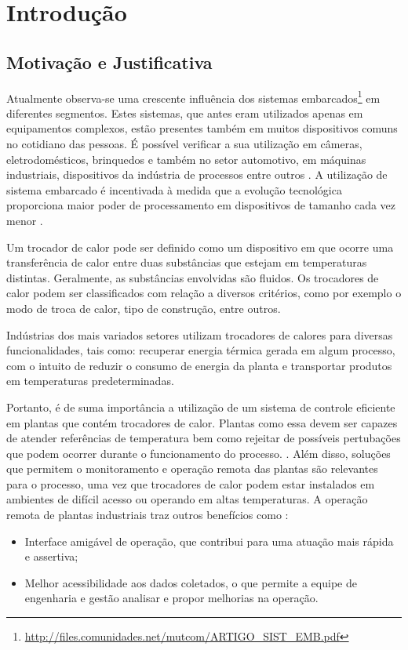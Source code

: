 \chapter{Introdução}
	
	\section{Motivação e Justificativa}
	
	Atualmente observa-se uma crescente influência dos sistemas embarcados\footnote{\url{http://files.comunidades.net/mutcom/ARTIGO_SIST_EMB.pdf}} em diferentes segmentos. Estes sistemas, que antes eram utilizados apenas em equipamentos complexos, estão presentes também em muitos dispositivos comuns no cotidiano das pessoas. É possível verificar a sua utilização em câmeras, eletrodomésticos, brinquedos e também no setor automotivo, em máquinas industriais, dispositivos da indústria de processos entre outros \cite{fabian2017,luiz2011}. A utilização de sistema embarcado é incentivada à medida que a evolução tecnológica proporciona maior poder de processamento em dispositivos de tamanho cada vez menor \cite{david2013}.

	Um trocador de calor pode ser definido como um dispositivo em que ocorre uma transferência de calor entre duas substâncias que estejam em temperaturas distintas. Geralmente, as substâncias envolvidas são fluidos. Os trocadores de calor podem ser classificados com relação a diversos critérios, como por exemplo o modo de troca de calor, tipo de construção, entre outros. \cite{kreith2011}
	
	Indústrias dos mais variados setores utilizam trocadores de calores para diversas funcionalidades, tais como: recuperar energia térmica gerada em algum processo, com o intuito de reduzir o consumo de energia da planta e transportar produtos em temperaturas predeterminadas.

	Portanto, é de suma importância a utilização de um sistema de controle eficiente em plantas que contém trocadores de calor. Plantas como essa devem ser capazes de atender referências de temperatura bem como rejeitar de possíveis pertubações que podem ocorrer durante o funcionamento do processo. \cite{novazzi2007}. Além disso, soluções que permitem o monitoramento e operação remota das plantas são relevantes para o processo, uma vez que trocadores de calor podem estar instalados em ambientes de difícil acesso ou operando em altas temperaturas. A operação remota de plantas industriais traz outros benefícios como \cite{babau2009}:
	\begin{itemize}
		\item 
		Interface amigável de operação, que contribui para uma atuação mais rápida e assertiva;
		\item 
		Melhor acessibilidade aos dados coletados, o que permite a equipe de engenharia e gestão analisar e propor melhorias na operação.
	\end{itemize}

